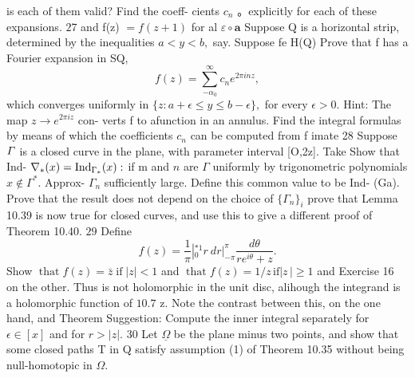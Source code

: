 is each of them valid? Find the coeff- cients $c_{n}$ 。explicitly for each of these expansions. $27$ and f(z) $=f(z+1)$ for al $\scriptstyle{\varepsilon\circ\mathbf{a}}$ Suppose Q is a horizontal strip, determined by the inequalities $a<y<b,$ say. Suppose fe H(Q) Prove that f has a Fourier expansion in SQ, $$ f(z)=\sum_{-\alpha_{0}}^{\infty}c_{n}e^{2\pi i n z}, $$ which converges uniformly in $\{z\colon a+\epsilon\leq y\leq b-\epsilon\},$ for every $\epsilon>0.$ Hint: The map $z\to e^{2\pi i z}$ con- verts f to afunction in an annulus. Find the integral formulas by means of which the coefficients $c_{n}$ can be computed from f imate 28 Suppose ${\mit\Gamma}$ is a closed curve in the plane, with parameter interval [O,2z]. Take Show that Ind- ${\bf\nabla}_{*}(x)=\mathrm{Ind}_{\Gamma_{*}}(x):$ if m and $\scriptstyle n$ are ${\Gamma}$ uniformly by trigonometric polynomials $x\notin\Gamma^{*}.$ Approx- $\Gamma_{n}$ sufficiently large. Define this common value to be Ind- (Ga). Prove that the result does not depend on the choice of $\{\Gamma_{n}\}_{i}$ prove that Lemma 10.39 is now true for closed curves, and use this to give a different proof of Theorem 10.40. $29$ Define $$ f(z)={\frac{1}{\pi}}\left|_{0}^{*1}r~d r\right.\left.\right|_{-\pi}^{\pi}{\frac{d\theta}{r e^{i\theta}+z}}. $$ Show $\operatorname{that}f(z)={\bar{z}}\operatorname{if}\left|z\right|<1$ and $\operatorname{that}f(z)=1/z\,\mathrm{if}\left|z\,\right|\geq1$ and Exercise 16 on the other. Thus is not holomorphic in the unit disc, alihough the integrand is a holomorphic function of $10.7$ z. Note the contrast between this, on the one hand, and Theorem Suggestion: Compute the inner integral separately for $\scriptstyle{\epsilon\in[x]}$ and for $r>|z|.$ 30 Let $\underline{{\Omega}}$ be the plane minus two points, and show that some closed paths T in Q satisfy assumption (1) of Theorem 10.35 without being null-homotopic in $\Omega.$